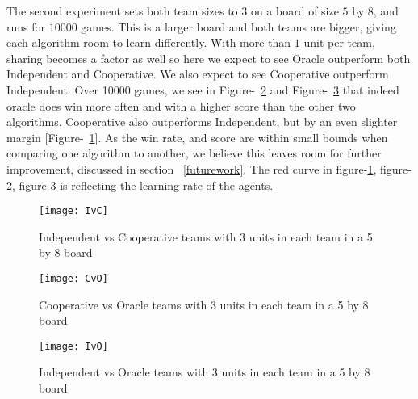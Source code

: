 The second experiment sets both team sizes to $3$ on a board of size $5$ by $8$, and runs for $10000$ games. This is a larger board and both teams are bigger, giving each algorithm room to learn differently. With more than $1$ unit per team, sharing becomes a factor as well so here we expect to see Oracle outperform both Independent and Cooperative. We also expect to see Cooperative outperform Independent. Over 10000 games, we see in Figure-~\ref{fig:CvO} and Figure-~\ref{fig:IvO} that indeed oracle does win more often and with a higher score than the other two algorithms. Cooperative also outperforms Independent, but by an even slighter margin [Figure-~\ref{fig:IvC}]. As the win rate, and score are within small bounds when comparing one algorithm to another, we believe this leaves room for further improvement, discussed in section ~\ref{futurework}. The red curve in figure-\ref{fig:IvC}, figure-\ref{fig:CvO}, figure-\ref{fig:IvO} is reflecting the learning rate of the agents.

\begin{figure}[htb]

\begin{minipage}[b]{1.0\linewidth}
  \centering
  \centerline{\texttt{[image: IvC]}}
  \caption{Independent vs Cooperative teams with 3 units in each team in a 5 by 8 board}
\label{fig:IvC}
\end{minipage}
\end{figure}

\begin{figure}[htb]
\begin{minipage}[b]{1.0\linewidth}
  \centering
  \centerline{\texttt{[image: CvO]}}
  \caption{Cooperative vs Oracle teams with 3 units in each team in a 5 by 8 board}
\label{fig:CvO}
\end{minipage}
\end{figure}

\begin{figure}[htb]
\begin{minipage}[b]{1.0\linewidth}
  \centering
  \centerline{\texttt{[image: IvO]}}
  \caption{Independent vs Oracle teams with 3 units in each team in a 5 by 8 board}
\label{fig:IvO}
\end{minipage}

%
\end{figure}


